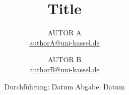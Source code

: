 

\author{%
  AUTOR A\\%
  \href{mailto:authorA@uni-kassel.de}{authorA@uni-kassel.de}%
  \and%
  AUTOR B\\%
  \href{mailto:authorB@uni-kassel.de}{authorB@uni-kassel.de}%
}
\publishers{Universität Kassel – Institut für Physik und CINSaT}

\subject{V\[1-6\]}
\title{Title}
\date{%
  Durchführung: Datum
  \hspace{3em}
  Abgabe: Datum
}



\maketitle
\thispagestyle{empty}
\tableofcontents
\newpage






\printbibliography{}

